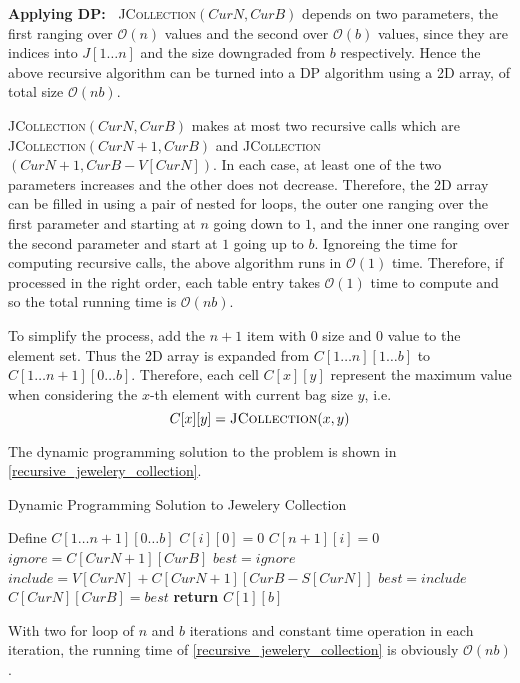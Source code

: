 \begin{homeworkProblem}
\vspace{1em}
\noindent
\textbf{Applying DP:\ }
\textsc{JCollection}$(CurN, CurB)$ depends on two parameters, the first
ranging over $\mathcal{O}(n)$ values and the second over $\mathcal{O}(b)$
values, since they are indices into $J[1\ldots n]$ and the size downgraded
from $b$ respectively. Hence the above recursive algorithm can be turned
into a DP algorithm using a 2D array, of total size $\mathcal{O}(nb)$.

\textsc{JCollection}$(CurN, CurB)$ makes at most two recursive calls 
which are \textsc{JCollection}$(CurN+1, CurB)$ and
\textsc{JCollection}$(CurN+1, CurB-V[CurN])$.
In each case, at least one of the two parameters increases and the
other does not decrease. Therefore, the 2D array can be filled in
using a pair of nested for loops, the outer one ranging over the
first parameter and starting at $n$ going down to $1$, and the inner
one ranging over the second parameter and start at $1$ going up
to $b$. Ignoreing the time for computing recursive calls, the above
algorithm runs in $\mathcal{O}(1)$ time. Therefore, if processed
in the right order, each table entry takes $\mathcal{O}(1)$ time to
compute and so the total running time is $\mathcal{O}(nb)$.

To simplify the process, add the $n+1$ item with $0$ size and $0$ value
to the element set. Thus the 2D array is expanded from $C[1\ldots n][1\ldots b]$ to $C[1\ldots n+1][0\ldots b]$.
Therefore, each cell $C[x][y]$ represent the maximum value when considering the
$x$-th element with current bag size $y$, i.e. 
\[C[x][y] = \text{\textsc{JCollection}}(x,y)\]

The dynamic programming solution to the problem is shown in \cref{recursive_jewelery_collection}.

\begin{algorithm}[H]
    \caption{Dynamic Programming Solution to Jewelery Collection}\label{dp_jewelery_collection}
    \begin{algorithmic}[1]
            \State Define $C[1\ldots n+1][0\ldots b]$
                \State $C[i][0] = 0$
            \EndFor
                \State $C[n+1][i] = 0$
            \EndFor
                    \State $ignore = C[CurN+1][CurB]$
                    \State $best = ignore$
                        \State $include = V[CurN] + C[CurN+1][CurB-S[CurN]]$
                            \State $best = include$
                        \EndIf
                    \EndIf
                    \State $C[CurN][CurB] = best$
                \EndFor
            \EndFor
            \State \textbf{return }$C[1][b]$
        \EndProcedure
    \end{algorithmic}
\end{algorithm}

With two for loop of $n$ and $b$ iterations and constant time operation in each iteration, the running time of \cref{recursive_jewelery_collection} is obviously $\mathcal{O}(nb)$.

\end{homeworkProblem}
